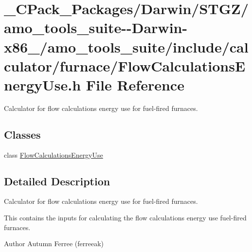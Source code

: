 \hypertarget{___c_pack___packages_2_darwin_2_s_t_g_z_2amo__tools__suite--_darwin-x86__64_2amo__tools__suite_2aa662891a85863ab2a5643413f77ebfb}{}\section{\+\_\+\+C\+Pack\+\_\+\+Packages/\+Darwin/\+S\+T\+G\+Z/amo\+\_\+tools\+\_\+suite-\/-\/\+Darwin-\/x86\+\_/amo\+\_\+tools\+\_\+suite/include/calculator/furnace/\+Flow\+Calculations\+Energy\+Use.h File Reference}
\label{___c_pack___packages_2_darwin_2_s_t_g_z_2amo__tools__suite--_darwin-x86__64_2amo__tools__suite_2aa662891a85863ab2a5643413f77ebfb}


Calculator for flow calculations energy use for fuel-\/fired furnaces.  


\subsection*{Classes}
\begin{DoxyCompactItemize}
\item 
class \hyperlink{class_flow_calculations_energy_use}{Flow\+Calculations\+Energy\+Use}
\end{DoxyCompactItemize}


\subsection{Detailed Description}
Calculator for flow calculations energy use for fuel-\/fired furnaces. 

This contains the inputs for calculating the flow calculations energy use fuel-\/fired furnaces.

\begin{DoxyAuthor}{Author}
Autumn Ferree (ferreeak) 
\end{DoxyAuthor}
